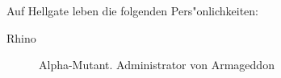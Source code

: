 
Auf Hellgate leben die folgenden Pers"onlichkeiten: 

\begin{description}    
    \item[Rhino] Alpha-Mutant. Administrator von Armageddon
\end{description}
